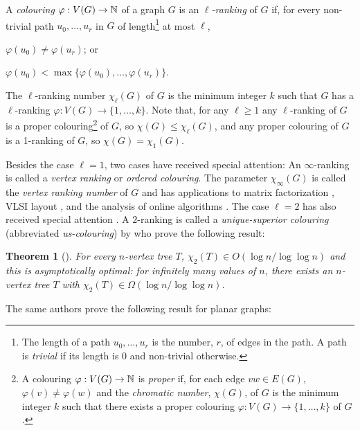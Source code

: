 \documentclass[kpfonts]{patmorin}
\newcommand{\trn}{\chi_2}
\newtheorem{othertheorem}{Theorem}
\theoremstyle{named}
\begin{document}
A \emph{colouring} $\varphi:V(G)\to \mathbb{N}$ of a graph $G$ is an \emph{$\ell$-ranking} of $G$ if, for every non-trivial path $u_0,\ldots,u_r$ in $G$ of length\footnote{The length of a path $u_0,\ldots,u_r$ is the number, $r$, of edges in the path. A path is \emph{trivial} if its length is 0 and non-trivial otherwise.} at most $\ell$,
\begin{inparaenum}[(i)]
    \item $\varphi(u_0)\neq\varphi(u_r)$; or \item $\varphi(u_0)<\max\{\varphi(u_0),\ldots,\varphi(u_{r})\}$.
\end{inparaenum}
The $\ell$-ranking number $\chi_\ell(G)$ of $G$ is the minimum integer $k$ such that $G$ has a $\ell$-ranking $\varphi:V(G)\to \{1,\ldots,k\}$.  Note that, for any $\ell\ge 1$ any $\ell$-ranking of $G$ is a proper colouring\footnote{A colouring $\varphi:V(G)\to \mathbb{N}$ is \emph{proper} if, for each edge $vw\in E(G)$, $\varphi(v)\neq\varphi(w)$ and the \emph{chromatic number}, $\chi(G)$, of $G$ is the minimum integer $k$ such that there exists a proper colouring $\varphi:V(G)\to\{1,\ldots,k\}$ of $G$.} of $G$, so $\chi(G)\le \chi_\ell(G)$, and any proper colouring of $G$ is a 1-ranking of $G$, so $\chi(G)=\chi_1(G)$.

Besides the case $\ell=1$, two cases have received special attention: An $\infty$-ranking is called a \emph{vertex ranking} or \emph{ordered colouring}. The parameter $\chi_\infty(G)$ is called the \emph{vertex ranking number} of $G$ and has applications to matrix factorization \cite{bodlaender.gilbert.ea:approximating,duff.reid:multifrontal,liu:role,dereniowski.kubale:cholesky}, VLSI layout \cite{leiserson:area,sen.deng.ea:on}, and the analysis of online algorithms \cite{even.smorodinsky:hitting}. The case $\ell=2$ has also received special attention \cite{almeter.demircan.ea:graph,karpas.neiman.ea:on,shalu.antony:complexity}. A $2$-ranking is called a \emph{unique-superior colouring} (abbreviated \emph{us-colouring}) by \citet{karpas.neiman.ea:on} who prove the following result:

\setcounter{othertheorem}{19}
\begin{othertheorem}[\cite{karpas.neiman.ea:on}]\label{trees}
    For every $n$-vertex tree $T$, $\trn(T)\in O(\log n/\log\log n)$ and this is asymptotically optimal: for infinitely many values of $n$, there exists an $n$-vertex tree $T$ with $\trn(T)\in\Omega(\log n/\log\log n)$.
\end{othertheorem}

The same authors prove the following result for planar graphs:
\end{document}
